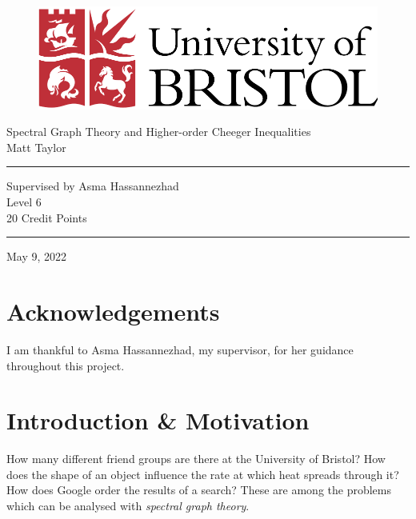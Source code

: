 \documentclass[a4paper,11pt]{article}
\theoremstyle{definition}
\begin{document}
\thispagestyle{empty}

\begin{figure}[h]
\begin{center}
\vspace{0.5cm}
\includegraphics[scale=0.5]{uob.pdf}
\end{center}
\end{figure}

\begin{center}
{\Large Spectral Graph Theory and Higher-order Cheeger Inequalities\\ \vspace{1cm}Matt Taylor}
\end{center}

\vspace{3cm}
\hrule
\begin{center}
Supervised by Asma Hassannezhad\\
Level 6\\
20 Credit Points
\end{center}
\hrule

\vspace{3cm}
\begin{center}
May 9, 2022
\end{center}

\pagebreak

\section*{Acknowledgements}

\small I am thankful to Asma Hassannezhad, my supervisor, for her guidance throughout this project. \normalsize

\tableofcontents

\pagebreak

\section{Introduction \& Motivation}
How many different friend groups are there at the University of Bristol? How does the shape of an object influence the rate at which heat spreads through it? How does Google order the results of a search? These are among the problems which can be analysed with \emph{spectral graph theory}.
\end{document}
